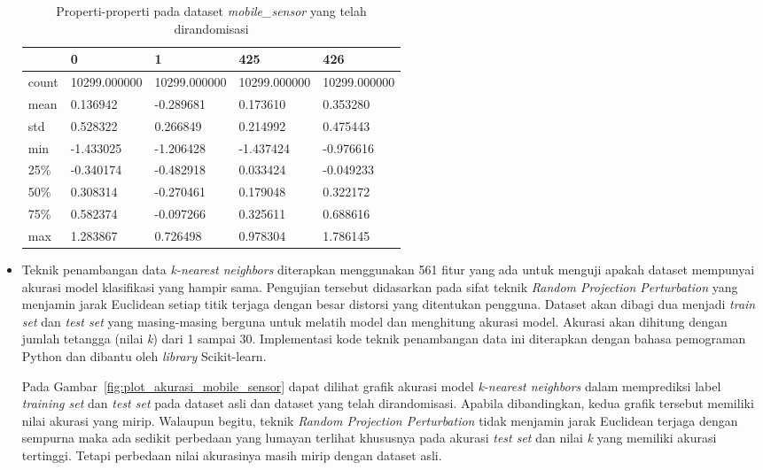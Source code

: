 \begin{itemize}
	\begin{table}
		\centering
		\caption{Properti-properti pada dataset \textit{mobile\_sensor} yang telah dirandomisasi}
		\begin{tabular}{l|llll}
			\hline
			& 0 & 1 & 425 & 426 \\ \hline
			count & 10299.000000 & 10299.000000 & 10299.000000 & 10299.000000 \\
			mean & 0.136942 & -0.289681 & 0.173610 & 0.353280 \\
			std & 0.528322 & 0.266849 & 0.214992 & 0.475443 \\
			min & -1.433025 & -1.206428 & -1.437424 & -0.976616 \\
			25\% & -0.340174 & -0.482918 & 0.033424 & -0.049233 \\
			50\% & 0.308314 & -0.270461 & 0.179048 & 0.322172 \\
			75\% & 0.582374 & -0.097266 & 0.325611 & 0.688616 \\
			max & 1.283867 & 0.726498 & 0.978304 & 1.786145 \\
			\hline
		\end{tabular}
		\label{table:properti-mobile-sensor-asli}
	\end{table}
	\item Teknik penambangan data \textit{k-nearest neighbors} diterapkan menggunakan 561 fitur yang ada untuk menguji apakah dataset mempunyai akurasi model klasifikasi yang hampir sama. Pengujian tersebut didasarkan pada sifat teknik \textit{Random Projection Perturbation} yang menjamin jarak Euclidean setiap titik terjaga dengan besar distorsi yang ditentukan pengguna. Dataset akan dibagi dua menjadi \textit{train set} dan \textit{test set} yang masing-masing berguna untuk melatih model dan menghitung akurasi model. Akurasi akan dihitung dengan jumlah tetangga (nilai \textit{k}) dari 1 sampai 30. Implementasi kode teknik penambangan data ini diterapkan dengan bahasa pemograman Python dan dibantu oleh \textit{library} Scikit-learn.

	Pada Gambar~\ref{fig:plot_akurasi_mobile_sensor} dapat dilihat grafik akurasi model \textit{k-nearest neighbors} dalam memprediksi label \textit{training set} dan \textit{test set} pada dataset asli dan dataset yang telah dirandomisasi. Apabila dibandingkan, kedua grafik tersebut memiliki nilai akurasi yang mirip. Walaupun begitu, teknik \textit{Random Projection Perturbation} tidak menjamin jarak Euclidean terjaga dengan sempurna maka ada sedikit perbedaan yang lumayan terlihat khususnya pada akurasi \textit{test set} dan nilai \textit{k} yang memiliki akurasi tertinggi. Tetapi perbedaan nilai akurasinya masih mirip dengan dataset asli.
	

\end{itemize}
